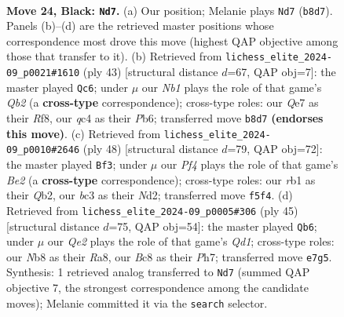 \documentclass[11pt]{article}
\begin{document}
\clearpage

\begin{figure}[p]\centering
\begin{subfigure}{0.46\textwidth}\centering
\resizebox{\linewidth}{!}{%
\newchessgame
\chessboard[
  setfen={rnb3k1/1p2q2p/4r1p1/p3Np2/2Q5/2B1P1P1/P4PKP/1R2R3 b - - 3 24},
  showmover=false,
  pgfstyle=straightmove, color=movearrow, markmove={b8-d7}
]}
\caption{}
\end{subfigure}\hfill
\begin{subfigure}{0.46\textwidth}\centering
\resizebox{\linewidth}{!}{%
\newchessgame
\chessboard[
  setfen={3r1rk1/pq3pp1/1p2p1b1/7p/5Q2/2N1B1P1/PP3P1P/3RR1K1 b - - 1 22},
  showmover=false,
  pgfstyle=straightmove, color=movearrow, markmove={b7-c6}
]}
\caption{}
\end{subfigure}
\\[4pt]
\begin{subfigure}{0.46\textwidth}\centering
\resizebox{\linewidth}{!}{%
\newchessgame
\chessboard[
  setfen={r2r2k1/4qpp1/2p3bp/1p1n4/1P1R4/4P2P/1Q1NBPP1/3R2K1 w - - 2 25},
  showmover=false,
  pgfstyle=straightmove, color=movearrow, markmove={e2-f3}
]}
\caption{}
\end{subfigure}\hfill
\begin{subfigure}{0.46\textwidth}\centering
\resizebox{\linewidth}{!}{%
\newchessgame
\chessboard[
  setfen={r2q3k/p5pp/2p2r2/3pn3/2b4Q/2N1P1P1/P5BP/R2R2K1 b - - 0 23},
  showmover=false,
  pgfstyle=straightmove, color=movearrow, markmove={d8-b6}
]}
\caption{}
\end{subfigure}
\caption{\textbf{Move 24, Black: \texttt{Nd7}.} (a) Our position; Melanie plays \texttt{Nd7} (\texttt{b8d7}). Panels (b)--(d) are the retrieved master positions whose correspondence most drove this move (highest QAP objective among those that transfer to it). (b) Retrieved from \texttt{lichess\_elite\_2024-09\_p0021\#1610} (ply 43) [structural distance $d$=67, QAP obj=7]: the master played \texttt{Qc6}; under $\mu$ our \emph{Nb1} plays the role of that game's \emph{Qb2} (a \textbf{cross-type} correspondence); cross-type roles: our \emph{Q}e7 as their \emph{R}f8, our \emph{q}c4 as their \emph{P}b6; transferred move \texttt{b8d7} \textbf{(endorses this move)}. (c) Retrieved from \texttt{lichess\_elite\_2024-09\_p0010\#2646} (ply 48) [structural distance $d$=79, QAP obj=72]: the master played \texttt{Bf3}; under $\mu$ our \emph{Pf4} plays the role of that game's \emph{Be2} (a \textbf{cross-type} correspondence); cross-type roles: our \emph{r}b1 as their \emph{Q}b2, our \emph{b}c3 as their \emph{N}d2; transferred move \texttt{f5f4}. (d) Retrieved from \texttt{lichess\_elite\_2024-09\_p0005\#306} (ply 45) [structural distance $d$=75, QAP obj=54]: the master played \texttt{Qb6}; under $\mu$ our \emph{Qe2} plays the role of that game's \emph{Qd1}; cross-type roles: our \emph{N}b8 as their \emph{R}a8, our \emph{B}c8 as their \emph{P}h7; transferred move \texttt{e7g5}. Synthesis: 1 retrieved analog transferred to \texttt{Nd7} (summed QAP objective 7, the strongest correspondence among the candidate moves); Melanie committed it via the \texttt{search} selector.}
\label{fig:thought-m47}
\end{figure}
\end{document}
